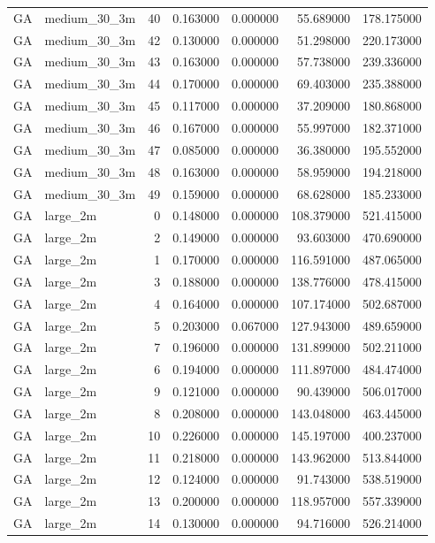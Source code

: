 \begin{tabular}{llrrrrr}
GA & medium_30_3m & 40 & 0.163000 & 0.000000 & 55.689000 & 178.175000 \\
GA & medium_30_3m & 42 & 0.130000 & 0.000000 & 51.298000 & 220.173000 \\
GA & medium_30_3m & 43 & 0.163000 & 0.000000 & 57.738000 & 239.336000 \\
GA & medium_30_3m & 44 & 0.170000 & 0.000000 & 69.403000 & 235.388000 \\
GA & medium_30_3m & 45 & 0.117000 & 0.000000 & 37.209000 & 180.868000 \\
GA & medium_30_3m & 46 & 0.167000 & 0.000000 & 55.997000 & 182.371000 \\
GA & medium_30_3m & 47 & 0.085000 & 0.000000 & 36.380000 & 195.552000 \\
GA & medium_30_3m & 48 & 0.163000 & 0.000000 & 58.959000 & 194.218000 \\
GA & medium_30_3m & 49 & 0.159000 & 0.000000 & 68.628000 & 185.233000 \\
GA & large_2m & 0 & 0.148000 & 0.000000 & 108.379000 & 521.415000 \\
GA & large_2m & 2 & 0.149000 & 0.000000 & 93.603000 & 470.690000 \\
GA & large_2m & 1 & 0.170000 & 0.000000 & 116.591000 & 487.065000 \\
GA & large_2m & 3 & 0.188000 & 0.000000 & 138.776000 & 478.415000 \\
GA & large_2m & 4 & 0.164000 & 0.000000 & 107.174000 & 502.687000 \\
GA & large_2m & 5 & 0.203000 & 0.067000 & 127.943000 & 489.659000 \\
GA & large_2m & 7 & 0.196000 & 0.000000 & 131.899000 & 502.211000 \\
GA & large_2m & 6 & 0.194000 & 0.000000 & 111.897000 & 484.474000 \\
GA & large_2m & 9 & 0.121000 & 0.000000 & 90.439000 & 506.017000 \\
GA & large_2m & 8 & 0.208000 & 0.000000 & 143.048000 & 463.445000 \\
GA & large_2m & 10 & 0.226000 & 0.000000 & 145.197000 & 400.237000 \\
GA & large_2m & 11 & 0.218000 & 0.000000 & 143.962000 & 513.844000 \\
GA & large_2m & 12 & 0.124000 & 0.000000 & 91.743000 & 538.519000 \\
GA & large_2m & 13 & 0.200000 & 0.000000 & 118.957000 & 557.339000 \\
GA & large_2m & 14 & 0.130000 & 0.000000 & 94.716000 & 526.214000 \\

\end{tabular}

